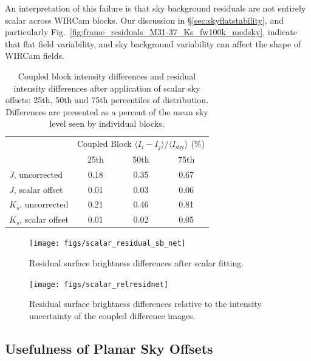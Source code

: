 \documentclass[iop]{emulateapj}
\newcommand{\Fig}[1]{Fig.~\ref{fig:#1}}  %
\newcommand{\Sec}[1]{\S\ref{sec:#1}}  %
\begin{document}
An interpretation of this failure is that sky background residuals are not entirely scalar across WIRCam blocks.
Our discussion in \Sec{skyflatstability}, and particularly \Fig{frame_residuals_M31-37_Ks_fw100k_medsky}, indicate that flat field variability, and sky background variability can affect the shape of WIRCam fields.

\begin{table}[t]
\centering
\caption[Coupled block differences and residual differences after
scalar sky offsets]{Coupled block intensity differences and residual intensity differences after application of scalar sky offsets: 25th, 50th and 75th percentiles of distribution.
Differences are presented as a percent of the mean sky level seen by individual blocks.}
\label{tab:resid_diffs}
\begin{tabular}{lccc}
& \multicolumn{3}{c}{Coupled Block $\langle I_i - I_j\rangle / \langle I_\mathrm{sky} \rangle$ (\%)} \\
& 25th & 50th & 75th \\
\hline
$J$, uncorrected & 0.18 & 0.35 & 0.67 \\
$J$, scalar offset & 0.01 & 0.03 & 0.06 \\
\hline
$K_s$, uncorrected & 0.21 & 0.46 & 0.81 \\
$K_s$, scalar offset & 0.01 & 0.02 & 0.05 \\
\hline
\end{tabular}
\end{table}

\begin{figure}[t]
\centering
\texttt{[image: figs/scalar\_residual\_sb\_net]}
\caption{Residual surface brightness differences after scalar fitting.}
\label{fig:scalar_residual_sb_net}
\end{figure}

\begin{figure}[t]
\centering
\texttt{[image: figs/scalar\_relresidnet]}
\caption{Residual surface brightness differences relative to the intensity uncertainty of the coupled difference images.}
\label{fig:scalar_relresidnet}
\end{figure}

\subsection{Usefulness of Planar Sky Offsets}
\label{sec:planar_offset_analysis}
\end{document}
